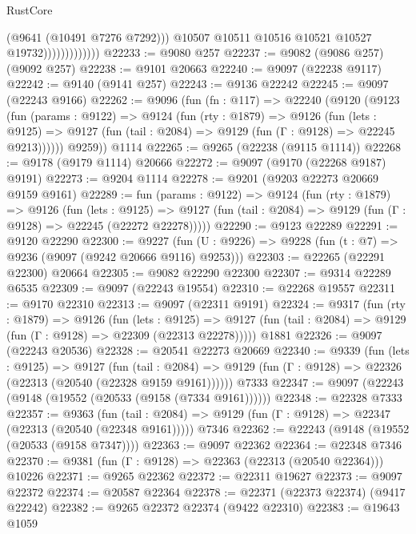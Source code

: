 \begin{lexlean}{RustCore}
\begin{coremodule}
                                (@9641 (@10491 @7276 @7292)))
                              @10507
                              @10511
                              @10516
                              @10521
                              @10527
                              @19732)))))))))))))
@22233 := @9080 @257
@22237 := @9082 (@9086 @257) (@9092 @257)
@22238 := @9101 @20663
@22240 := @9097 (@22238 @9117)
@22242 := @9140 (@9141 @257)
@22243 := @9136 @22242
@22245 := @9097 (@22243 @9166)
@22262 := @9096
    (fun (fn : @117) =>
    @22240
      (@9120
        (@9123
          (fun (params : @9122) =>
          @9124
            (fun (rty : @1879) =>
            @9126
              (fun (lets : @9125) =>
              @9127 (fun (tail : @2084) => @9129 (fun (Γ : @9128) => @22245 @9213))))))
        @9259))
    @1114
@22265 := @9265 (@22238 (@9115 @1114))
@22268 := @9178 (@9179 @1114) @20666
@22272 := @9097 (@9170 (@22268 @9187) @9191)
@22273 := @9204 @1114
@22278 := @9201 (@9203 @22273 @20669 @9159 @9161)
@22289 := fun (params : @9122) =>
  @9124
    (fun (rty : @1879) =>
    @9126
      (fun (lets : @9125) =>
      @9127 (fun (tail : @2084) => @9129 (fun (Γ : @9128) => @22245 (@22272 @22278)))))
@22290 := @9123 @22289
@22291 := @9120 @22290
@22300 := @9227
    (fun (U : @9226) => @9228 (fun (t : @7) => @9236 (@9097 (@9242 @20666 @9116) @9253)))
@22303 := @22265 (@22291 @22300) @20664
@22305 := @9082 @22290 @22300
@22307 := @9314 @22289 @6535
@22309 := @9097 (@22243 @19554)
@22310 := @22268 @19557
@22311 := @9170 @22310
@22313 := @9097 (@22311 @9191)
@22324 := @9317
    (fun (rty : @1879) =>
    @9126
      (fun (lets : @9125) =>
      @9127 (fun (tail : @2084) => @9129 (fun (Γ : @9128) => @22309 (@22313 @22278)))))
    @1881
@22326 := @9097 (@22243 @20536)
@22328 := @20541 @22273 @20669
@22340 := @9339
    (fun (lets : @9125) =>
    @9127
      (fun (tail : @2084) =>
      @9129 (fun (Γ : @9128) => @22326 (@22313 (@20540 (@22328 @9159 @9161))))))
    @7333
@22347 := @9097 (@22243 (@9148 (@19552 (@20533 (@9158 (@7334 @9161))))))
@22348 := @22328 @7333
@22357 := @9363
    (fun (tail : @2084) => @9129 (fun (Γ : @9128) => @22347 (@22313 (@20540 (@22348 @9161)))))
    @7346
@22362 := @22243 (@9148 (@19552 (@20533 (@9158 @7347))))
@22363 := @9097 @22362
@22364 := @22348 @7346
@22370 := @9381 (fun (Γ : @9128) => @22363 (@22313 (@20540 @22364))) @10226
@22371 := @9265 @22362
@22372 := @22311 @19627
@22373 := @9097 @22372
@22374 := @20587 @22364
@22378 := @22371 (@22373 @22374) (@9417 @22242)
@22382 := @9265 @22372 @22374 (@9422 @22310)
@22383 := @19643 @1059

\end{coremodule}
\end{lexlean}
